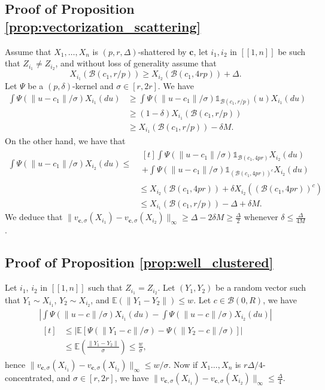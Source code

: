 \documentclass[noinfoline,preprint]{article}
\newcommand{\cb}{\mathbf{c}}
\newcommand{\E}{\mathbb{E}}
\renewcommand{\1}{\mathds 1}
\newcommand{\B}{\mathcal{B}}
\begin{document}
\subsection{Proof of Proposition \ref{prop:vectorization_scattering}}\label{sec:proof_prop_vectorization_scattering}  
Assume that $X_1, \hdots, X_n$ is $(p,r,\Delta)$-shattered by $\cb$, let $i_1, i_2$ in $[\![1,n]\!]$ be such that $Z_{i_1} \neq Z_{i_2}$, and without loss of generality assume that
\[
X_{i_1}(\B(c_1,r/p)) \geq  X_{i_2}(\B(c_1,4rp)) + \Delta.
\]
Let $\Psi$ be a $(p,\delta)$-kernel and $\sigma \in [r,2r]$. We have
\begin{align*}
\int \Psi(\|u-c_1\|/\sigma) X_{i_1}(du) & \geq  \int\Psi(\|u-c_1\|/\sigma) \mathds{1}_{\B(c_1,r/p)}(u) X_{i_1}(du) \\
& \geq (1-\delta) X_{i_1}\left(\B(c_1,r/p)\right )\\
& \geq X_{i_1}\left(\B(c_1,r/p) \right ) - \delta M. 
\end{align*}
On the other hand, we have that
\begin{align*}
 \int \Psi(\|u-c_1\|/\sigma)X_{i_2}(du) \leq & \begin{multlined}[t]  \int \Psi(\|u-c_1\|/\sigma) \mathds{1}_{\B(c_1,4pr)}  X_{i_2}(du) \\ +  \int \Psi(\|u-c_1\|/\sigma) \mathds{1}_{(\B(c_1,4pr))^c} X_{i_2}(du)
\end{multlined} \\
& \leq X_{i_2}(\B(c_1,4pr)) + \delta X_{i_2}((\B(c_1,4pr))^c) \\
& \leq X_{i_1}\left(\B(c_1,r/p) \right ) - \Delta + \delta M.
\end{align*}
We deduce that $\|v_{\cb,\sigma}(X_{i_1}) -v_{\cb,\sigma}(X_{i_2}) \|_\infty \geq \Delta - 2 \delta M \geq \frac{\Delta}{2}$
whenever $\delta \leq \frac{\Delta}{4M}$.

\subsection{Proof of Proposition \ref{prop:well_clustered}}\label{sec:proof_prop_well_clustered}
Let $i_1$, $i_2$ in $[\![1,n]\!]$ such that $Z_{i_1} = Z_{i_2}$. Let $(Y_1,Y_2)$ be a random vector such that $Y_1 \sim X_{i_1}$, $Y_2 \sim X_{i_2}$, and $\mathbb{E}(\|Y_1-Y_2\|) \leq w$. Let $c \in \B(0,R)$, we have
\begin{multline*}
\left |  \int \Psi(\|u-c\|/\sigma) X_{i_1}(du) -  \int \Psi(\|u-c\|/\sigma) X_{i_2}(du) \right | \\
\begin{aligned}[t]
& \leq \left | \mathbb{E}\left [ \Psi(\|Y_1 - c\|/\sigma) - \Psi(\|Y_2 - c\|/\sigma) \right ] \right | \\
& \leq \E \left ( \frac{\|Y_1-Y_2\|}{\sigma} \right ) \leq \frac{w}{\sigma}, 
\end{aligned}
\end{multline*} 
hence $\|v_{\cb,\sigma}(X_{i_1})-v_{\cb,\sigma}(X_{i_2})\|_\infty \leq w/\sigma$. Now if $X_1 \hdots, X_n$ is $r \Delta/4$-concentrated, and $\sigma \in [r,2r]$, we have $\|v_{\cb,\sigma}(X_{i_1})-v_{\cb,\sigma}(X_{i_2})\|_\infty \leq \frac{\Delta}{4}$.
\end{document}
